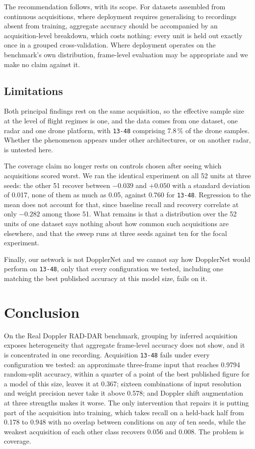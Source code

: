 \documentclass[11pt,a4paper]{article}
\newcommand{\s}[1]{\texttt{#1}}            %
\newcommand{\tgt}{\s{13-48}}               %
\begin{document}
The recommendation follows, with its scope. For datasets assembled from continuous acquisitions, where deployment requires generalising to recordings absent from training, aggregate accuracy should be accompanied by an acquisition-level breakdown, which costs nothing: every unit is held out exactly once in a grouped cross-validation. Where deployment operates on the benchmark's own distribution, frame-level evaluation may be appropriate and we make no claim against it.

\subsection{Limitations}
\label{sec:limits}

Both principal findings rest on the same acquisition, so the effective sample size at the level of flight regimes is one, and the data comes from one dataset, one radar and one drone platform, with \tgt{} comprising 7.8\,\% of the drone samples. Whether the phenomenon appears under other architectures, or on another radar, is untested here.

The coverage claim no longer rests on controls chosen after seeing which acquisitions scored worst. We ran the identical experiment on all 52 units at three seeds: the other 51 recover between $-0.039$ and $+0.050$ with a standard deviation of 0.017, none of them as much as 0.05, against 0.760 for \tgt. Regression to the mean does not account for that, since baseline recall and recovery correlate at only $-0.282$ among those 51. What remains is that a distribution over the 52 units of one dataset says nothing about how common such acquisitions are elsewhere, and that the sweep runs at three seeds against ten for the focal experiment.

Finally, our network is not DopplerNet and we cannot say how DopplerNet would perform on \tgt, only that every configuration we tested, including one matching the best published accuracy at this model size, fails on it.

\section{Conclusion}
\label{sec:conclusion}

On the Real Doppler RAD-DAR benchmark, grouping by inferred acquisition exposes heterogeneity that aggregate frame-level accuracy does not show, and it is concentrated in one recording. Acquisition \tgt{} fails under every configuration we tested: an approximate three-frame input that reaches 0.9794 random-split accuracy, within a quarter of a point of the best published figure for a model of this size, leaves it at 0.367; sixteen combinations of input resolution and weight precision never take it above 0.578; and Doppler shift augmentation at three strengths makes it worse. The only intervention that repairs it is putting part of the acquisition into training, which takes recall on a held-back half from 0.178 to 0.948 with no overlap between conditions on any of ten seeds, while the weakest acquisition of each other class recovers 0.056 and 0.008. The problem is coverage.
\end{document}
